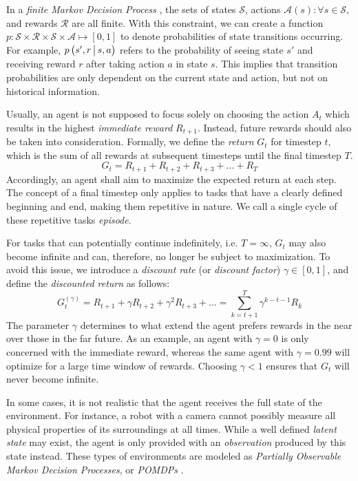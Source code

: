 In a \textit{finite Markov Decision Process} \cite{bible}, the sets of states $\mathscr{S}$, actions $\mathscr{A}(s) : \forall s \in \mathscr{S}$, and rewards $\mathscr{R}$ are all finite. With this constraint, we can create a function $p : \mathscr{S} \times \mathscr{R} \times \mathscr{S} \times \mathscr{A} \mapsto \left[0, 1\right]$ to denote probabilities of state transitions occurring. For example, $p\left(s', r \,\middle|\, s, a\right)$ refers to the probability of seeing state $s'$ and receiving reward $r$ after taking action $a$ in state $s$. This implies that transition probabilities are only dependent on the current state and action, but not on historical information.

Usually, an agent is not supposed to focus solely on choosing the action $A_t$ which results in the highest \textit{immediate reward} $R_{t+1}$. Instead, future rewards should also be taken into consideration. Formally, we define the \textit{return} $G_t$ for timestep $t$, which is the sum of all rewards at subsequent timesteps until the final timestep $T$.
\begin{equation*}
    G_t = R_{t+1} + R_{t+2} + R_{t+3} + ... + R_T
\end{equation*}
Accordingly, an agent shall aim to maximize the expected return at each step. The concept of a final timestep only applies to tasks that have a clearly defined beginning and end, making them repetitive in nature. We call a single cycle of these repetitive tasks \textit{episode}.

For tasks that can potentially continue indefinitely, i.e. $T = \infty$, $G_t$ may also become infinite and can, therefore, no longer be subject to maximization. To avoid this issue, we introduce a \textit{discount rate} (or \textit{discount factor}) $\gamma \in [0, 1]$, and define the \textit{discounted return} as follows:
\begin{equation*}
    G_t^{(\gamma)} = R_{t+1} + \gamma R_{t+2} + \gamma^2 R_{t+3} + ...
        = \sum_{k=t+1}^T \gamma^{k-t-1} R_k
\end{equation*}
The parameter $\gamma$ determines to what extend the agent prefers rewards in the near over those in the far future. As an example, an agent with $\gamma = 0$ is only concerned with the immediate reward, whereas the same agent with $\gamma = 0.99$ will optimize for a large time window of rewards. Choosing $\gamma < 1$ ensures that $G_t$ will never become infinite.

In some cases, it is not realistic that the agent receives the full state of the environment. For instance, a robot with a camera cannot possibly measure all physical properties of its surroundings at all times. While a well defined \textit{latent state} may exist, the agent is only provided with an \textit{observation} produced by this state instead. These types of environments are modeled as \textit{Partially Observable Markov Decision Processes}, or \textit{POMDPs} \cite{bible}.